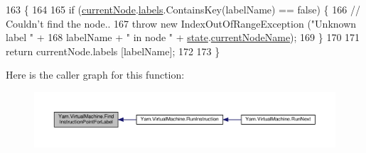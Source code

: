 \begin{DoxyCode}
163                                                                     \{
164 
165             \textcolor{keywordflow}{if} (\hyperlink{a00152_ab7594e14981ad75cecea3b2e7dcf895c}{currentNode}.\hyperlink{a00041_a9afa49f4fbc72e806a0210cb4198f12e}{labels}.ContainsKey(labelName) == \textcolor{keyword}{false}) \{
166                 \textcolor{comment}{// Couldn't find the node..}
167                 \textcolor{keywordflow}{throw} \textcolor{keyword}{new} IndexOutOfRangeException (\textcolor{stringliteral}{"Unknown label "} +
168                     labelName + \textcolor{stringliteral}{" in node "} + \hyperlink{a00152_a70f2ce6201cdd2430ceaa764ac614ca0}{state}.\hyperlink{a00155_a86f481fad527f719b49f8fee6ff79764}{currentNodeName});
169             \}
170 
171             \textcolor{keywordflow}{return} currentNode.labels [labelName];
172 
173         \}
\end{DoxyCode}


Here is the caller graph for this function\-:
\nopagebreak
\begin{figure}[H]
\begin{center}
\leavevmode
\includegraphics[width=350pt]{a00152_af613c8b2d098678b6ea05b509c0a0cb6_icgraph}
\end{center}
\end{figure}


